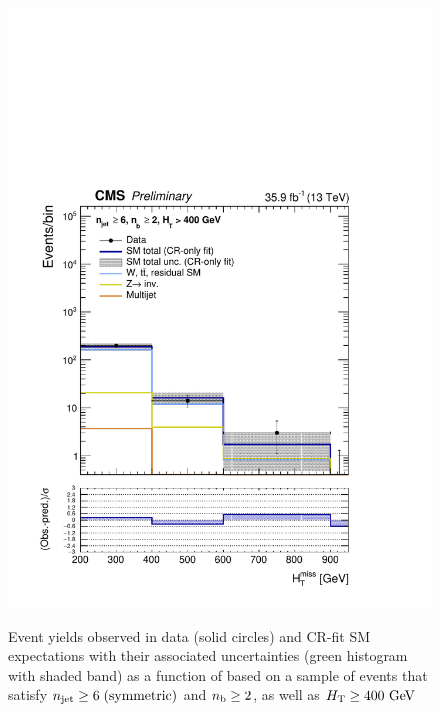 \clearpage
\begin{figure}[h!]
  \centering
  \caption{Event yields observed in data (solid circles) and CR-fit SM expectations with their associated uncertainties 
  (green histogram with shaded band) as a function of \HTmiss based on a sample of events that satisfy 
  $n_{\text{jet}} \geq 6 \; \textrm{(symmetric)}$ and $n_{\text{b}} \geq 2$, as well as $\mbox{$H_\text{T}$} \geq 400 \textrm{ GeV}$ }
  \includegraphics[width=0.8\linewidth]{figures/results/36invfb_preapproval/aggregated/postFitShapeCR/mhtShape_ge2b_ge6j_400_Inf_crfit.pdf}
  \label{fig:aggregated_results_8}
\end{figure}
